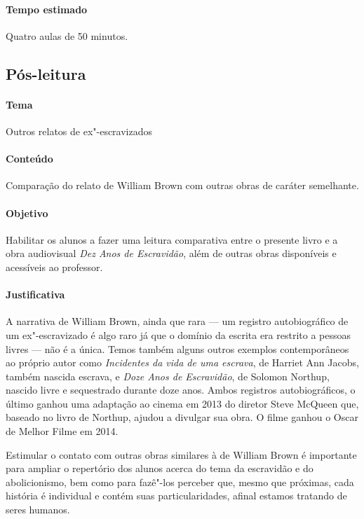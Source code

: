 \documentclass[12pt]{extarticle}
\begin{document}
 \paragraph{Tempo estimado} Quatro aulas de 50 minutos.



\subsection{Pós-leitura}

 \paragraph{Tema} Outros relatos de ex"-escravizados

 \paragraph{Conteúdo} Comparação do relato de William Brown com outras
 obras de caráter semelhante.

 \paragraph{Objetivo} Habilitar os alunos a fazer uma leitura comparativa
 entre o presente livro e a obra audiovisual \emph{Dez Anos de Escravidão},
 além de outras obras disponíveis e acessíveis ao professor. 

 \paragraph{Justificativa} A narrativa de William Brown, ainda que 
 rara --- um registro autobiográfico de um ex"-escravizado é algo raro
 já que o domínio da escrita era restrito a pessoas livres --- não 
 é a única. Temos também alguns outros exemplos contemporâneos 
 ao próprio autor como \emph{Incidentes da vida de uma escrava}, de Harriet
 Ann Jacobs, também nascida escrava, e \emph{Doze Anos de Escravidão}, de 
 Solomon Northup, nascido livre e sequestrado durante doze anos. Ambos 
 registros autobiográficos, o último ganhou uma adaptação ao cinema em 
 2013 do diretor Steve McQueen que, baseado no livro de Northup, ajudou
 a divulgar sua obra. O filme ganhou o Oscar de Melhor Filme em 2014. 

 Estimular o contato com outras obras similares à de William Brown
 é importante para ampliar o repertório dos alunos acerca do tema
 da escravidão e do abolicionismo, bem como para fazê"-los perceber
 que, mesmo que próximas, cada história é individual e contém 
 suas particularidades, afinal estamos tratando de seres humanos. 
\end{document}
